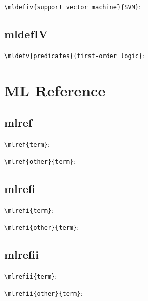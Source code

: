 \documentclass{article}
\begin{document}
\verb|\mldefiv{support vector machine}{SVM}|:
 \

\subsection{mldefIV}

\verb|\mldefv{predicates}{first-order logic}|:
 \

\section{ML Reference}

\subsection{mlref}

\verb|\mlref{term}|:

\verb|\mlref{other}{term}|:

\subsection{mlrefi}

\verb|\mlrefi{term}|:

\verb|\mlrefi{other}{term}|:

\subsection{mlrefii}

\verb|\mlrefii{term}|:

\verb|\mlrefii{other}{term}|:
\end{document}
